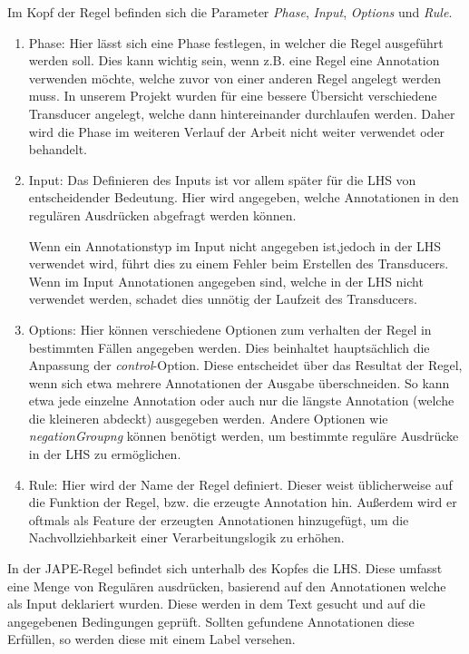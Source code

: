 \documentclass[12pt]{report}
\begin{document}
Im Kopf der Regel befinden sich die Parameter \textit{Phase}, \textit{Input}, \textit{Options} und \textit{Rule}.

 
\begin{enumerate}
\item Phase: Hier lässt sich eine Phase festlegen, in welcher die Regel ausgeführt werden soll. Dies kann wichtig sein, wenn z.B. eine Regel eine Annotation verwenden möchte, welche zuvor von einer anderen Regel angelegt werden muss. In unserem Projekt wurden für eine bessere Übersicht verschiedene Transducer angelegt, welche dann hintereinander durchlaufen werden. Daher wird die Phase im weiteren Verlauf der Arbeit nicht weiter verwendet oder behandelt.

\item Input: Das Definieren des Inputs ist vor allem später für die LHS von entscheidender Bedeutung. Hier wird angegeben, welche Annotationen in den regulären Ausdrücken abgefragt werden können.

Wenn ein Annotationstyp im Input nicht angegeben ist,jedoch in der LHS verwendet wird, führt dies zu einem Fehler beim Erstellen des Transducers. Wenn im Input Annotationen angegeben sind, welche in der LHS nicht verwendet werden, schadet dies unnötig der Laufzeit des Transducers.

\item Options: Hier können verschiedene Optionen zum verhalten der Regel in bestimmten Fällen angegeben werden. Dies beinhaltet hauptsächlich die Anpassung der \textit{control}-Option. Diese entscheidet über das Resultat der Regel, wenn sich etwa mehrere Annotationen der Ausgabe überschneiden. So kann etwa jede einzelne Annotation oder auch nur die längste Annotation (welche die kleineren abdeckt) ausgegeben werden. Andere Optionen wie \textit{negationGroupng} können benötigt werden, um bestimmte reguläre Ausdrücke in der LHS zu ermöglichen.

\item Rule: Hier wird der Name der Regel definiert. Dieser weist üblicherweise auf die Funktion der Regel, bzw. die erzeugte Annotation hin. Außerdem wird er oftmals als Feature der erzeugten Annotationen hinzugefügt, um die Nachvollziehbarkeit einer Verarbeitungslogik zu erhöhen. 
\end{enumerate}

In der JAPE-Regel befindet sich unterhalb des Kopfes die LHS.  Diese umfasst eine Menge von Regulären ausdrücken, basierend auf den Annotationen welche als Input deklariert wurden. Diese werden in dem Text gesucht und auf die angegebenen Bedingungen geprüft. Sollten gefundene Annotationen diese Erfüllen, so werden diese mit einem Label versehen. 
\end{document}
